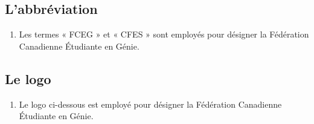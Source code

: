 \subsection{L'abbréviation}
\label{l-abbreviation}

\begin{enumerate}
 \item
  Les termes « FCEG » et « CFES » sont employés pour désigner la Fédération Canadienne Étudiante en Génie.
\end{enumerate}
\subsection{Le logo}
\label{le-logo}
\begin{enumerate}
 \item
  Le logo ci-dessous est employé pour désigner la Fédération Canadienne Étudiante en Génie.
\end{enumerate}
